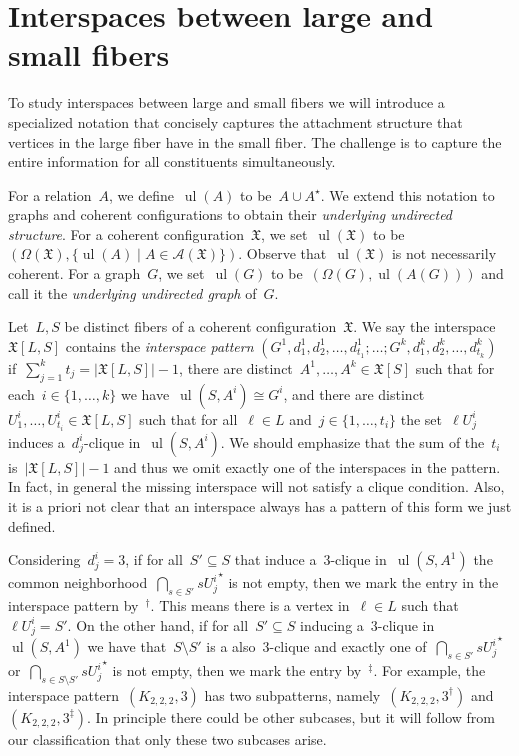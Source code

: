 \documentclass[english,a4paper]{article}
\theoremstyle{plain}
\theoremstyle{definition}
\newcommand{\abs}[1]{| #1 |}
\newcommand{\coherentConfig}{\ensuremath{\mathfrak{X}}}
\newcommand{\interspace}[2]{\ensuremath{\coherentConfig[#1,#2]}}
\newcommand{\inducedCC}[1]{\ensuremath{\coherentConfig[#1]}}
\DeclareMathOperator*{\ul}{ul}
\newcommand{\vertices}{\ensuremath{\Omega}}
\newcommand{\relations}{\ensuremath{\mathcal{A}}}
\newcommand{\arcs}{\ensuremath{A}}
\newcommand{\ipsixMatchingComplement} {\ensuremath{(\clique{2,2,2},3^\dag)}}
\newcommand{\ipsixMatchingComplementD}{\ensuremath{(\clique{2,2,2},3^\ddag)}}
\newcommand{\clique}[1]{\ensuremath{K_{#1}}}
\begin{document}
     

\section{Interspaces between large and small fibers}
\label{interspace-large-small/sec}

To study interspaces between large and small fibers we will introduce a specialized notation that concisely captures the attachment structure that vertices in the large fiber have in the small fiber.
The challenge is to capture the entire information for all constituents simultaneously.

For a relation~$\arcs$, we define~$\ul(\arcs)$ to be~$\arcs \cup \arcs^\star$.
We extend this notation to graphs and coherent configurations to obtain their \emph{underlying undirected structure}.
For a coherent configuration~$\coherentConfig$, we set~$\ul(\coherentConfig)$ to be~$(\vertices(\coherentConfig), \{\ul(\arcs) \mid \arcs \in \relations(\coherentConfig)\})$.
Observe that~$\ul(\coherentConfig)$ is not necessarily coherent.
For a graph~$G$, we set~$\ul(G)$ to be~$(\vertices(G), \ul(\arcs(G)))$ and call it the \emph{underlying undirected graph} of~$G$.

Let~$L,S$ be distinct fibers of a coherent configuration~$\coherentConfig$.
We say the interspace~$\interspace{L}{S}$ contains the \emph{interspace pattern} $(G^1, d^1_1, d^1_2, \dots, d^1_{t_1}; \dots; G^k, d^k_1, d^k_2, \dots, d^k_{t_k})$ if~$\sum_{j = 1}^{k} t_j = \abs{\interspace{L}{S}} - 1$, there are distinct~$\arcs^1, \dots, \arcs^k \in \inducedCC{S}$ such that for each~$i \in \{1,\dots,k\}$ we have~$\ul(S,\arcs^i) \cong G^i$, and there are distinct~$U^i_1, \dots, U^i_{t_i} \in \interspace{L}{S}$ such that for all~$\ell \in L$ and~$j \in \{1, \dots, t_i\}$ the set~$\ell U^i_j$ induces a~$d^i_j$-clique in~$\ul(S,A^i)$. We should emphasize that the sum of the~$t_i$ is~$\abs{\interspace{L}{S}} - 1$ and thus we omit exactly one of the interspaces in the pattern. In fact, in general the missing interspace will not satisfy a clique condition. Also, it is a priori not clear that an interspace always has a pattern of this form we just defined.

Considering~$d^i_j = 3$, if for all~$S' \subseteq S$ that induce a~$3$-clique in~$\ul(S,A^1)$ the common neighborhood~$\bigcap_{s \in S'} s {U^i_j}^\star$ is not empty, then we mark the entry in the interspace pattern by~$^\dag$. This means there is a vertex in~$\ell\in L$ such that~$\ell U^i_j= S'$.
On the other hand, if  for all~$S' \subseteq S$ inducing a~$3$-clique in~$\ul(S,A^1)$ we have that~$S\setminus S'$ is a also~$3$-clique and exactly one of~$\bigcap_{s \in S'} s {U^i_j}^\star$ or~$\bigcap_{s \in S \setminus S'} s {U^i_j}^\star$ is not empty, then we mark the entry by~$^\ddag$.
For example, the interspace pattern~$(\clique{2,2,2},3)$ has two subpatterns, namely~\ipsixMatchingComplement\xspace and~\ipsixMatchingComplementD. In principle there could be other subcases, but it will follow from our classification that only these two subcases arise.
\end{document}
